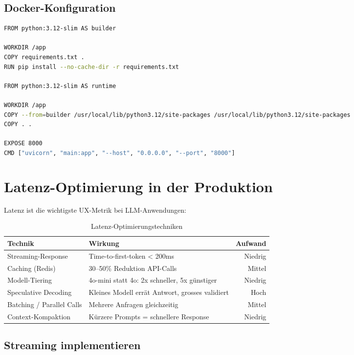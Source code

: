 \subsection{Docker-Konfiguration}

\begin{lstlisting}[language=bash, caption=Multi-Stage Dockerfile für LLM-Service]
FROM python:3.12-slim AS builder

WORKDIR /app
COPY requirements.txt .
RUN pip install --no-cache-dir -r requirements.txt

FROM python:3.12-slim AS runtime

WORKDIR /app
COPY --from=builder /usr/local/lib/python3.12/site-packages /usr/local/lib/python3.12/site-packages
COPY . .

EXPOSE 8000
CMD ["uvicorn", "main:app", "--host", "0.0.0.0", "--port", "8000"]
\end{lstlisting}

\section{Latenz-Optimierung in der Produktion}

Latenz ist die wichtigste UX-Metrik bei LLM-Anwendungen:

\begin{table}[H]
\centering
\begin{tabularx}{\linewidth}{lXr}
\toprule
\textbf{Technik} & \textbf{Wirkung} & \textbf{Aufwand} \\
\midrule
Streaming-Response & Time-to-first-token < 200ms & Niedrig \\
Caching (Redis) & 30--50\% Reduktion API-Calls & Mittel \\
Modell-Tiering & 4o-mini statt 4o: 2x schneller, 5x günstiger & Niedrig \\
Speculative Decoding & Kleines Modell errät Antwort, grosses validiert & Hoch \\
Batching / Parallel Calls & Mehrere Anfragen gleichzeitig & Mittel \\
Context-Kompaktion & Kürzere Prompts = schnellere Response & Niedrig \\
\bottomrule
\end{tabularx}
\caption{Latenz-Optimierungstechniken}
\end{table}

\subsection{Streaming implementieren}


